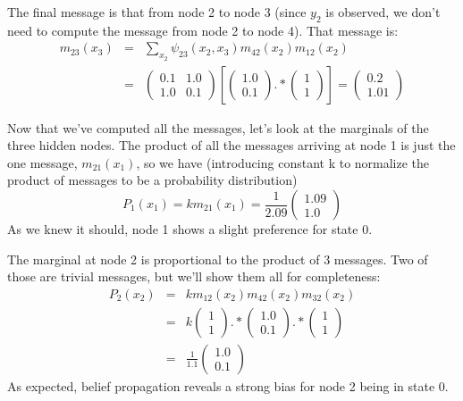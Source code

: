 The final message is that from node 2 to node 3 (since $y_2$ is
observed, we don't need to compute the message from node 2 to node
4).  That message is:
\begin{eqnarray}
m_{23}(x_3) & = & \sum_{x_2} \psi_{23} (x_2, x_3)   m_{42}(x_2) m_{12}(x_2) \\
& = & 
\left( 
\begin{array}{cc}
0.1 & 1.0 \\
1.0 & 0.1 
\end{array}
\right) 
\left[
\left( 
\begin{array}{c}
1.0 \\
0.1
\end{array}
\right) 
.*
\left( 
\begin{array}{c}
1 \\
1
\end{array}
\right) 
\right]
=
\left( 
\begin{array}{c}
0.2 \\
1.01
\end{array}
\right) 
\end{eqnarray}

Now that we've computed all the messages, let's look at the marginals
of the three hidden nodes.  The product of all the messages arriving
at node 1 is just the one message, $m_{21}(x_1)$, so we have
(introducing constant k to normalize the product of messages to be a
probability distribution)
\begin{equation}
P_1(x_1) = k m_{21}(x_1) 
=
\frac{1}{2.09}
\left( 
\begin{array}{c}
1.09 \\
1.0
\end{array}
\right) 
\end{equation}
As we knew it should, node 1 shows a slight preference for state 0.

The marginal at node 2 is proportional to the product of 3 messages.
Two of those are trivial messages, but we'll show them all for
completeness:
\begin{eqnarray}
P_2(x_2) & = & k m_{12}(x_2)  m_{42}(x_2)  m_{32}(x_2) \\
& = & k 
\left( 
\begin{array}{c} 
1 \\ 
1
\end{array}
\right) 
.*
\left( 
\begin{array}{c}
1.0 \\
0.1
\end{array}
\right) 
.* 
\left( 
\begin{array}{c} 
1 \\ 
1
\end{array}
\right) \\
& = &
\frac{1}{1.1}
\left( 
\begin{array}{c}
1.0 \\
0.1
\end{array}
\right) 
\end{eqnarray}
As expected, belief propagation reveals a strong bias for node 2 being in state 0.

